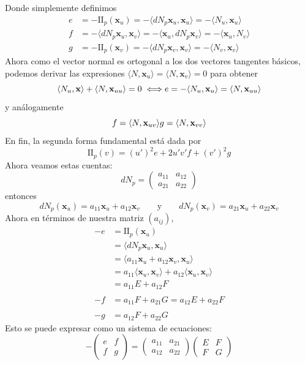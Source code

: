\documentclass[spanish]{book}
\theoremstyle{definition}
\begin{document}
Donde simplemente definimos
\begin{align*}
	e&=-\mathrm{I\!I}_p(\mathbf{x}_u)=-\langle dN_p\mathbf{x}_u,\mathbf{x}_u\rangle=-\langle N_u,\mathbf x_u\rangle\\ 
	f&=-\langle dN_p\mathbf{x}_u,\mathbf{x}_v\rangle=-\langle \mathbf{x}_u,dN_p\mathbf{x}_v\rangle=-\langle\mathbf x_u,N_v\rangle\\ 
	g&=-\mathrm{I\!I}_p(\mathbf{x}_v)=-\langle dN_p\mathbf{x}_v,\mathbf{x}_v\rangle=-\langle N_v,\mathbf x_v\rangle
\end{align*}
Ahora como el vector normal es ortogonal a los dos vectores tangentes básicos, podemos derivar las expresiones $\langle N,\mathbf x_u\rangle=\langle N,\mathbf x_v\rangle=0$ para obtener
\[\langle N_u,\mathbf x\rangle+\langle N,\mathbf x_{uu}\rangle=0\iff\\ e=-\langle N_u,\mathbf x_u\rangle=\langle N,\mathbf x_{uu}\rangle\]
y análogamente
\[f=\langle N,\mathbf x_{uv}\rangle\\
g=\langle N,\mathbf x_{vv}\rangle\]
En fin, la segunda forma fundamental está dada por
\[\mathrm{I\!I}_p(v)=(u')^2e+2u'v'f+(v')^2g\]
Ahora veamos estas cuentas:
\[dN_p=\begin{pmatrix}a_{11}&a_{12}\\a_{21}&a_{22}\end{pmatrix}\]
entonces
\[dN_p(\mathbf{x}_u)=a_{11}\mathbf{x}_u+a_{12}\mathbf{x}_v\qquad\text{y}\qquad dN_p(\mathbf{x}_v)=a_{21}\mathbf{x}_u+a_{22}\mathbf{x}_v\]
Ahora en términos de nuestra matriz $(a_{ij})$,
\begin{align*}
	-e&=\mathrm{I\!I}_p(\mathbf{x}_u)\\
	&=\langle dN_p\mathbf{x}_u,\mathbf{x}_u\rangle\\
	&=\langle a_{11}\mathbf{x}_u+a_{12}\mathbf{x}_v,\mathbf{x}_u\rangle\\
	&=a_{11}\langle\mathbf{x}_u,\mathbf{x}_v\rangle+a_{12}\langle\mathbf{x}_u,\mathbf{x}_v\rangle\\
	&=a_{11}E+a_{12}F\\ \\
	-f&=a_{11}F+a_{21}G=a_{12}E+a_{22}F\\\\
	-g&=a_{12}F+a_{22}G
\end{align*}
Esto se puede expresar como un sistema de ecuaciones:
\[-\begin{pmatrix}e&f\\f & g\end{pmatrix}=\begin{pmatrix}a_{11}&a_{21}\\a_{12}&a_{22}\end{pmatrix}\begin{pmatrix}E&F\\F&G\end{pmatrix}\]
\end{document}
